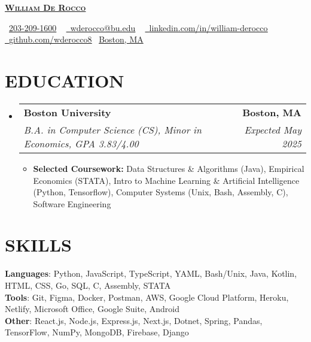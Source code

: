\documentclass[letterpaper,11pt]{article}
\makeatletter
\newcommand{\resumeItem}[1]{
  \item\small{
    {#1 \vspace{-3pt}}
  }
}
\newcommand{\resumeSubheading}[4]{
  \vspace{-3pt}\item
    \begin{tabular*}{1.0\textwidth}[t]{l@{\extracolsep{\fill}}r}
      \textbf{#1} & \textbf{\small #2} \\
      \textit{\small#3} & \textit{\small #4} \\
    \end{tabular*}\vspace{-7pt}
}
\newcommand{\resumeSubHeadingListStart}{\begin{itemize}[leftmargin=0.0in, label={}]}
\newcommand{\resumeSubHeadingListEnd}{\end{itemize}}
\newcommand{\resumeItemListStart}{\begin{itemize}}
\newcommand{\resumeItemListEnd}
{\end{itemize}\vspace{0pt}}
\makeatother
\begin{document}
    \begin{center}
        {\huge \scshape \textbf{\href{https://cs-people.bu.edu/wderocco/}{William De Rocco }}}
        
        \small
        \raisebox{-0.2\height}\faPhone\  \underline{203-209-1600} ~ 
        \href{mailto:wderocco@bu.edu}{\raisebox{-0.2\height}\faEnvelope\  \underline{wderocco@bu.edu}} ~ 
        \href{https://www.linkedin.com/in/william-derocco/}{\raisebox{-0.2\height}\faLinkedin\ \underline{linkedin.com/in/william-derocco}}  ~
        \href{https://www.github.com/wderocco8}{\raisebox{-0.2\height}\faGithub\ \underline{github.com/wderocco8}}
        \raisebox{-0.2\height}\faMapPin \ \underline{Boston, MA}
    \end{center}

\section{EDUCATION}
  \resumeSubHeadingListStart
  
    \resumeSubheading
    {Boston University}{Boston, MA}
    {B.A.  in Computer Science (CS), Minor in Economics, GPA 3.83/4.00}{Expected May 2025}
        \resumeItemListStart
            \resumeItem{\textbf{Selected Coursework:} Data Structures \& Algorithms (Java), Empirical Economics (STATA), Intro to Machine Learning \& Artificial Intelligence (Python, Tensorflow), Computer Systems (Unix, Bash, Assembly, C), Software Engineering}
        \resumeItemListEnd
        
  \resumeSubHeadingListEnd

\section{SKILLS}

    \vspace{-7pt}
    \begin{itemize}
    [leftmargin=0.15in, label={}]\small{\item{
        \textbf{Languages}{: Python, JavaScript, TypeScript, YAML, Bash/Unix, Java, Kotlin, HTML, CSS, Go, SQL, C, Assembly, STATA} \\
        \textbf{Tools}{: Git, Figma, Docker, Postman, AWS, Google Cloud Platform, Heroku, Netlify, Microsoft Office, Google Suite, Android} \\
        \textbf{Other}{: React.js, Node.js, Express.js, Next.js, Dotnet, Spring, Pandas, TensorFlow, NumPy, MongoDB, Firebase, Django} \\}}
    \end{itemize}
\end{document}
